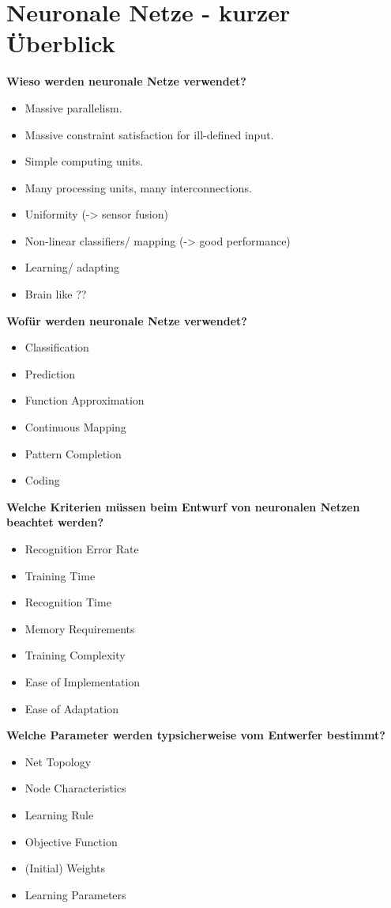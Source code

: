 \section{Neuronale Netze - kurzer Überblick}
\label{sset:neuronale-netze-kurzer-überblick}
\textbf{Wieso werden neuronale Netze verwendet?}
\begin{itemize}
	\item Massive parallelism.
	\item Massive constraint satisfaction for ill-defined input.
	\item Simple computing units.
	\item Many processing units, many interconnections.
	\item Uniformity (-> sensor fusion)
	\item Non-linear classifiers/ mapping (-> good performance)
	\item Learning/ adapting
	\item Brain like ??
\end{itemize}
\textbf{Wofür werden neuronale Netze verwendet?}
\begin{itemize}
	\item Classification
	\item Prediction
	\item Function Approximation
	\item Continuous Mapping
	\item Pattern Completion
	\item Coding
\end{itemize}
\textbf{Welche Kriterien müssen beim Entwurf von neuronalen Netzen beachtet werden?}
\begin{itemize}
	\item Recognition Error Rate
	\item Training Time
	\item Recognition Time
	\item Memory Requirements
	\item Training Complexity
	\item Ease of Implementation
	\item Ease of Adaptation
\end{itemize}
\textbf{Welche Parameter werden typsicherweise vom Entwerfer bestimmt?}
\begin{itemize}
	\item Net Topology
	\item Node Characteristics
	\item Learning Rule
	\item Objective Function
	\item (Initial) Weights
	\item Learning Parameters
\end{itemize}
